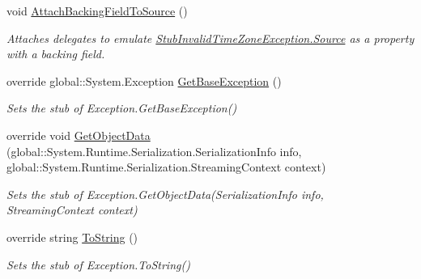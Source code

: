 \begin{DoxyCompactItemize}
void \hyperlink{class_system_1_1_fakes_1_1_stub_invalid_time_zone_exception_ab2a9def8e54cc55d27c12c5fb7b5293c}{Attach\-Backing\-Field\-To\-Source} ()
\begin{DoxyCompactList}\small\item\em Attaches delegates to emulate \hyperlink{class_system_1_1_fakes_1_1_stub_invalid_time_zone_exception_af06d914f5a5e529fef21f9e656b0b2ab}{Stub\-Invalid\-Time\-Zone\-Exception.\-Source} as a property with a backing field.\end{DoxyCompactList}\item 
override global\-::\-System.\-Exception \hyperlink{class_system_1_1_fakes_1_1_stub_invalid_time_zone_exception_a624f2b1b0fcc51042d55c946cf3301e9}{Get\-Base\-Exception} ()
\begin{DoxyCompactList}\small\item\em Sets the stub of Exception.\-Get\-Base\-Exception()\end{DoxyCompactList}\item 
override void \hyperlink{class_system_1_1_fakes_1_1_stub_invalid_time_zone_exception_aa0c1a085af2573b9821e7ab3f570a284}{Get\-Object\-Data} (global\-::\-System.\-Runtime.\-Serialization.\-Serialization\-Info info, global\-::\-System.\-Runtime.\-Serialization.\-Streaming\-Context context)
\begin{DoxyCompactList}\small\item\em Sets the stub of Exception.\-Get\-Object\-Data(\-Serialization\-Info info, Streaming\-Context context)\end{DoxyCompactList}\item 
override string \hyperlink{class_system_1_1_fakes_1_1_stub_invalid_time_zone_exception_a683ad5f44fa1fb62e1755d8b37c8c67d}{To\-String} ()
\begin{DoxyCompactList}\small\item\em Sets the stub of Exception.\-To\-String()\end{DoxyCompactList}\end{DoxyCompactItemize}
